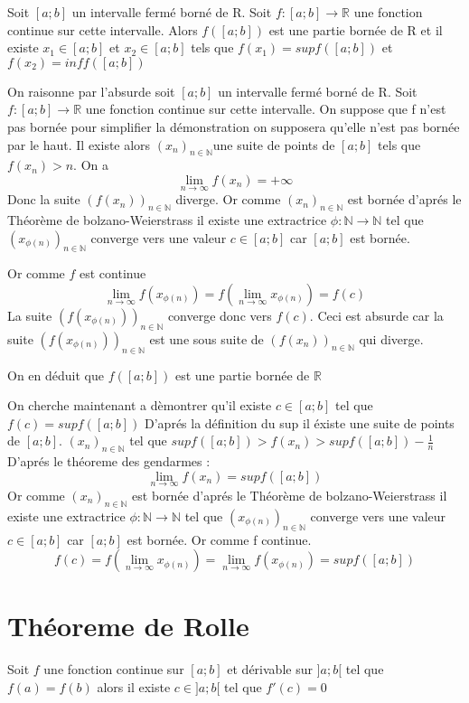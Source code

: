 \documentclass[a4paper,10pt]{article}
\begin{document}
Soit $[a; b]$ un intervalle fermé borné de R. Soit $f \colon [a;b] \longrightarrow \mathbb{R}$ une fonction continue sur cette intervalle. Alors
$f([a;b])$ est une partie bornée de R et il existe $x_{1} \in [a;b]$ et $x_{2} \in [a;b]$ tels que $f(x_{1}) = sup f([a;b])$ et $f(x_{2}) = inf f([a;b])$





On raisonne par l'absurde soit  $[a; b]$ un intervalle fermé borné de R. Soit $f \colon [a;b] \longrightarrow \mathbb{R}$ une fonction continue sur cette intervalle.
On suppose que f n'est pas bornée pour simplifier la démonstration on supposera qu'elle n'est pas bornée par le haut. 
Il existe alors $(x_{n})_{n \in \mathbb{N}}$une suite de points de $[a; b]$ tels que $f(x_{n}) > n$. 
On a \[\lim_{n \to \infty} f(x_{n}) = +\infty\]
Donc la suite $(f(x_{n}))_{n \in \mathbb{N}}$ diverge.
Or comme $(x_{n})_{n \in \mathbb{N}}$ est bornée d'aprés le Théorème de bolzano-Weierstrass il existe une
extractrice $\phi \colon \mathbb{N} \longrightarrow \mathbb{N}$ tel que $(x_{\phi(n)})_{n \in \mathbb{N}}$ converge vers une valeur $c \in [a; b]$ car 
$[a;b]$ est bornée.

Or comme $f$ est continue \[\lim_{n \to \infty} f(x_{\phi(n)}) = f(\lim_{n \to \infty} x_{\phi(n)}) = f(c)\]
La suite $(f(x_{\phi(n)}))_{n \in \mathbb{N}}$ converge donc vers $f(c)$. Ceci est absurde car la suite $(f(x_{\phi(n)}))_{n \in \mathbb{N}}$ est
une sous suite de $(f(x_{n}))_{n \in \mathbb{N}}$ qui diverge.


On en déduit que $f([a; b])$ est une partie bornée de $\mathbb{R}$


On cherche maintenant a dèmontrer qu'il existe $c \in [a;b]$ tel que $f(c) = sup f([a; b])$
D'aprés la définition du sup il éxiste une suite de points de $[a; b]$. $(x_{n})_{n \in \mathbb{N}}$ tel que $sup f([a; b]) > f(x_{n}) >sup f([a; b]) -\frac{1}{n}$
D'aprés le théoreme des gendarmes :
\[\lim_{n \to \infty} f(x_{n}) = sup f([a; b])\]
Or comme $(x_{n})_{n \in \mathbb{N}}$ est bornée d'aprés le Théorème de bolzano-Weierstrass il existe une
extractrice $\phi \colon \mathbb{N} \longrightarrow \mathbb{N}$ tel que $(x_{\phi(n)})_{n \in \mathbb{N}}$ converge vers une valeur $c \in [a; b]$ car 
$[a;b]$ est bornée. Or comme f continue.
\[f(c) = f(\lim_{n \to \infty} x_{\phi(n)}) = \lim_{n \to \infty} f(x_{\phi(n)}) = sup f([a; b])\]
\section{Théoreme de Rolle}
Soit $f$ une fonction continue sur $[a; b]$ et dérivable sur $]a;b[$ tel que $f(a) = f(b)$ alors il
existe $c \in ]a;b[$ tel que $f'(c) = 0$
\end{document}
